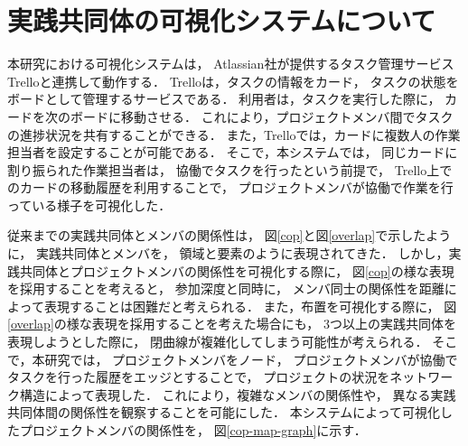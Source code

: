 \documentclass[submit,techrep]{ipsj}
\begin{document}

\section{実践共同体の可視化システムについて}
\label{system-map}

本研究における可視化システムは，
Atlassian社が提供するタスク管理サービスTrello\cite{trello}と連携して動作する．
Trelloは，タスクの情報をカード，
タスクの状態をボードとして管理するサービスである．
利用者は，タスクを実行した際に，
カードを次のボードに移動させる．
これにより，プロジェクトメンバ間でタスクの進捗状況を共有することができる．
また，Trelloでは，カードに複数人の作業担当者を設定することが可能である．
そこで，本システムでは，
同じカードに割り振られた作業担当者は，
協働でタスクを行ったという前提で，
Trello上でのカードの移動履歴を利用することで，
プロジェクトメンバが協働で作業を行っている様子を可視化した．

従来までの実践共同体とメンバの関係性は，
図\ref{cop}と図\ref{overlap}で示したように，
実践共同体とメンバを，
領域と要素のように表現されてきた．
しかし，実践共同体とプロジェクトメンバの関係性を可視化する際に，
図\ref{cop}の様な表現を採用することを考えると，
参加深度と同時に，
メンバ同士の関係性を距離によって表現することは困難だと考えられる．
また，布置を可視化する際に，
図\ref{overlap}の様な表現を採用することを考えた場合にも，
3つ以上の実践共同体を表現しようとした際に，
閉曲線が複雑化してしまう可能性が考えられる．
そこで，本研究では，
プロジェクトメンバをノード，
プロジェクトメンバが協働でタスクを行った履歴をエッジとすることで，
プロジェクトの状況をネットワーク構造によって表現した．
これにより，複雑なメンバの関係性や，
異なる実践共同体間の関係性を観察することを可能にした．
本システムによって可視化したプロジェクトメンバの関係性を，
図\ref{cop-map-graph}に示す．
\end{document}
